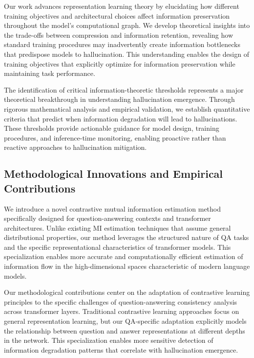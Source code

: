 Our work advances representation learning theory by elucidating how different training objectives and architectural choices affect information preservation throughout the model's computational graph. We develop theoretical insights into the trade-offs between compression and information retention, revealing how standard training procedures may inadvertently create information bottlenecks that predispose models to hallucination. This understanding enables the design of training objectives that explicitly optimize for information preservation while maintaining task performance.

The identification of critical information-theoretic thresholds represents a major theoretical breakthrough in understanding hallucination emergence. Through rigorous mathematical analysis and empirical validation, we establish quantitative criteria that predict when information degradation will lead to hallucinations. These thresholds provide actionable guidance for model design, training procedures, and inference-time monitoring, enabling proactive rather than reactive approaches to hallucination mitigation.

\subsection{Methodological Innovations and Empirical Contributions}

We introduce a novel contrastive mutual information estimation method specifically designed for question-answering contexts and transformer architectures. Unlike existing MI estimation techniques that assume general distributional properties, our method leverages the structured nature of QA tasks and the specific representational characteristics of transformer models. This specialization enables more accurate and computationally efficient estimation of information flow in the high-dimensional spaces characteristic of modern language models.

Our methodological contributions center on the adaptation of contrastive learning principles to the specific challenges of question-answering consistency analysis across transformer layers. Traditional contrastive learning approaches focus on general representation learning, but our QA-specific adaptation explicitly models the relationship between question and answer representations at different depths in the network. This specialization enables more sensitive detection of information degradation patterns that correlate with hallucination emergence.

